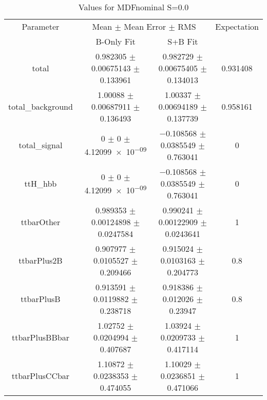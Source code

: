 \begin{table}
\centering
\caption{Values for MDFnominal S=0.0}
\begin{tabular}{cccc}
\toprule
Parameter & \multicolumn{2}{c}{Mean $\pm$ Mean Error $\pm$ RMS} & Expectation\\
 & B-Only Fit & S+B Fit & \\
\midrule
total & \num{0.982305} $\pm$ \num{0.00675143} $\pm$ \num{0.133961} & \num{0.982729} $\pm$ \num{0.00675405} $\pm$ \num{0.134013} & \num{0.931408}\\
total\_background & \num{1.00088} $\pm$ \num{0.00687911} $\pm$ \num{0.136493} & \num{1.00337} $\pm$ \num{0.00694189} $\pm$ \num{0.137739} & \num{0.958161}\\
total\_signal & \num{0} $\pm$ \num{0} $\pm$ \num{4.12099e-09} & \num{-0.108568} $\pm$ \num{0.0385549} $\pm$ \num{0.763041} & \num{0}\\
ttH\_hbb & \num{0} $\pm$ \num{0} $\pm$ \num{4.12099e-09} & \num{-0.108568} $\pm$ \num{0.0385549} $\pm$ \num{0.763041} & \num{0}\\
ttbarOther & \num{0.989353} $\pm$ \num{0.00124898} $\pm$ \num{0.0247584} & \num{0.990241} $\pm$ \num{0.00122909} $\pm$ \num{0.0243641} & \num{1}\\
ttbarPlus2B & \num{0.907977} $\pm$ \num{0.0105527} $\pm$ \num{0.209466} & \num{0.915024} $\pm$ \num{0.0103163} $\pm$ \num{0.204773} & \num{0.8}\\
ttbarPlusB & \num{0.913591} $\pm$ \num{0.0119882} $\pm$ \num{0.238718} & \num{0.918386} $\pm$ \num{0.012026} $\pm$ \num{0.23947} & \num{0.8}\\
ttbarPlusBBbar & \num{1.02752} $\pm$ \num{0.0204994} $\pm$ \num{0.407687} & \num{1.03924} $\pm$ \num{0.0209733} $\pm$ \num{0.417114} & \num{1}\\
ttbarPlusCCbar & \num{1.10872} $\pm$ \num{0.0238353} $\pm$ \num{0.474055} & \num{1.10029} $\pm$ \num{0.0236851} $\pm$ \num{0.471066} & \num{1}\\
\bottomrule
\end{tabular}
\end{table}